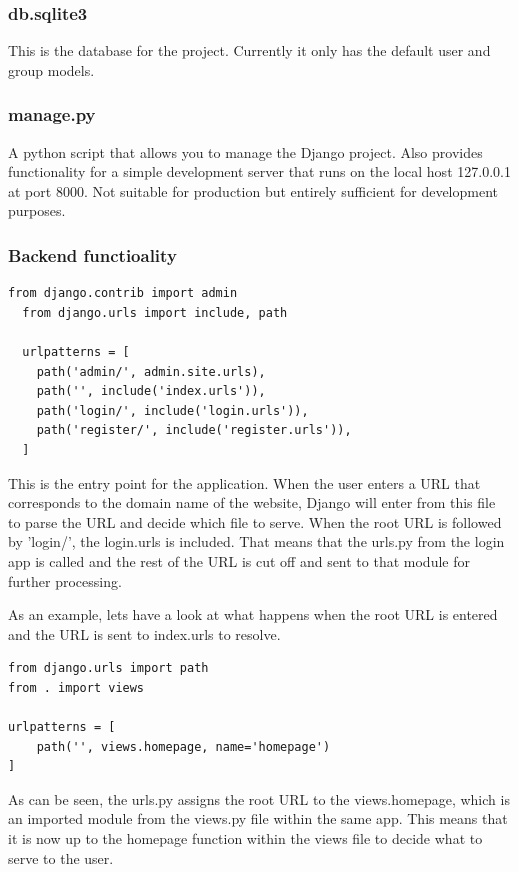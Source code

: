 \documentclass{article}
\begin{document}
\subsubsection{db.sqlite3}

This is the database for the project. Currently it only has the default user and group models. 

\subsubsection{manage.py}

A python script that allows you to manage the Django project. Also provides functionality for a simple development server that runs on the local host 127.0.0.1 at port 8000. Not suitable for production but entirely sufficient for development purposes. 

\subsubsection{Backend functioality}

\begin{lstlisting}[caption={master/urls.py}]
  from django.contrib import admin
  from django.urls import include, path

  urlpatterns = [
    path('admin/', admin.site.urls),
    path('', include('index.urls')),
    path('login/', include('login.urls')),
    path('register/', include('register.urls')),
  ]
\end{lstlisting}

This is the entry point for the application. When the user enters a URL that corresponds to the domain name of the website, Django will enter from this file to parse the URL and decide which file to serve. When the root URL is followed by 'login/', the login.urls is included. That means that the urls.py from the login app is called and the rest of the URL is cut off and sent to that module for further processing. 

As an example, lets have a look at what happens when the root URL is entered and the URL is sent to index.urls to resolve.

\begin{lstlisting}[caption={index/urls.py}]
from django.urls import path
from . import views

urlpatterns = [
    path('', views.homepage, name='homepage')
]
\end{lstlisting}

As can be seen, the urls.py assigns the root URL to the views.homepage, which is an imported module from the views.py file within the same app. This means that it is now up to the homepage function within the views file to decide what to serve to the user. 
\end{document}
